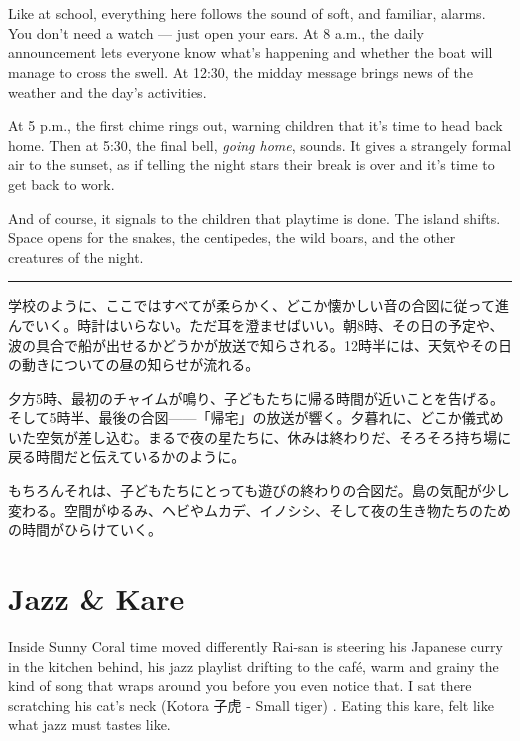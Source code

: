 \documentclass[
  letterpaper,
  oneside]{scrbook}
\begin{document}
\chapter{}\label{section-4}

Like at school, everything here follows the sound of soft, and familiar,
alarms. You don't need a watch --- just open your ears. At 8 a.m., the
daily announcement lets everyone know what's happening and whether the
boat will manage to cross the swell. At 12:30, the midday message brings
news of the weather and the day's activities.

At 5 p.m., the first chime rings out, warning children that it's time to
head back home. Then at 5:30, the final bell, \emph{going home}, sounds.
It gives a strangely formal air to the sunset, as if telling the night
stars their break is over and it's time to get back to work.

And of course, it signals to the children that playtime is done. The
island shifts. Space opens for the snakes, the centipedes, the wild
boars, and the other creatures of the night.

\begin{center}\rule{0.5\linewidth}{0.5pt}\end{center}

学校のように、ここではすべてが柔らかく、どこか懐かしい音の合図に従って進んでいく。時計はいらない。ただ耳を澄ませばいい。朝8時、その日の予定や、波の具合で船が出せるかどうかが放送で知らされる。12時半には、天気やその日の動きについての昼の知らせが流れる。

夕方5時、最初のチャイムが鳴り、子どもたちに帰る時間が近いことを告げる。そして5時半、最後の合図------「帰宅」の放送が響く。夕暮れに、どこか儀式めいた空気が差し込む。まるで夜の星たちに、休みは終わりだ、そろそろ持ち場に戻る時間だと伝えているかのように。

もちろんそれは、子どもたちにとっても遊びの終わりの合図だ。島の気配が少し変わる。空間がゆるみ、ヘビやムカデ、イノシシ、そして夜の生き物たちのための時間がひらけていく。


\chapter{Jazz \& Kare}\label{jazz-kare}

Inside Sunny Coral time moved differently Rai-san is steering his
Japanese curry in the kitchen behind, his jazz playlist drifting to the
café, warm and grainy the kind of song that wraps around you before you
even notice that. I sat there scratching his cat's neck (Kotora 子虎 -
Small tiger) . Eating this kare, felt like what jazz must tastes like.
\end{document}
